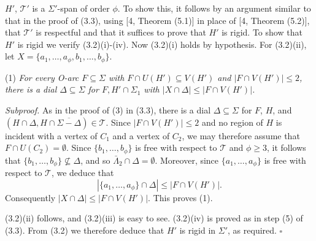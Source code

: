 \noindent $H'$, $\mathcal{T}'$ is a $\Sigma'$-span of order $\phi$. To show this, it follows by an argument similar to that in the proof of (3.3), using [4, Theorem (5.1)] in place of [4, Theorem (5.2)], that $\mathcal{T}'$ is respectful and that it suffices to prove that $H'$ is rigid. To show that $H'$ is rigid we verify (3.2)(i)-(iv). Now (3.2)(i) holds by hypothesis. For (3.2)(ii), let $X = \{a_1, \dots, a_\phi, b_1, \dots, b_\phi\}$.

\hspace*{12pt}(1) \textit{For every O-arc $F \subseteq \Sigma$ with $F \cap U(H') \subseteq V(H')$ and $|F \cap V(H')| \le 2$, there is a dial $\Delta \subseteq \Sigma$ for $F, H' \cap \Sigma_1$ with $|X \cap \Delta| \le |F \cap V(H')|$.}

\textit{Subproof.} As in the proof of (3) in (3.3), there is a dial $\Delta \subseteq \Sigma$ for $F$, $H$, and $(H \cap \Delta, H \cap \overline{\Sigma - \Delta}) \in \mathcal{T}$. Since $|F \cap V(H')| \le 2$ and no region of $H$ is incident with a vertex of $C_1$ and a vertex of $C_2$, we may therefore assume that $F \cap U(C_2) = \emptyset$. Since $\{b_1, \dots, b_\phi\}$ is free with respect to $\mathcal{T}$ and $\phi \ge 3$, it follows that $\{b_1, \dots, b_\phi\} \not\subseteq \Delta$, and so $\bar{\Lambda}_2 \cap \Delta = \emptyset$. Moreover, since $\{a_1, \dots, a_\phi\}$ is free with respect to $\mathcal{T}$, we deduce that
\begin{equation*}
|\{a_1, \dots, a_\phi\} \cap \Delta| \le |F \cap V(H')|.
\end{equation*}
Consequently $|X \cap \Delta| \le |F \cap V(H')|$. This proves (1).

\stmt
(3.2)(ii) follows, and (3.2)(iii) is easy to see. (3.2)(iv) is proved as in step (5) of (3.3). From (3.2) we therefore deduce that $H'$ is rigid in $\Sigma'$, as required. $\square$


